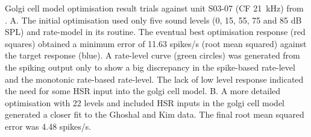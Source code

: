 Golgi cell model optimisation result trials against unit S03-07 (CF 21~kHz) from
\citep{GhoshalKim:1996}. A. The initial optimisation used only five sound levels
(0, 15, 55, 75 and 85 dB SPL) and rate-model in its routine. The eventual best
optimisation response (red squares) obtained a minimum error of 11.63 spikes/s
(root mean squared) against the target response (blue). A rate-level curve
(green circles) was generated from the spiking output only to show a big
discrepancy in the spike-based rate-level and the monotonic rate-based
rate-level. The lack of low level response indicated the need for some HSR input
into the golgi cell model. B. A more detailed optimisation with 22 levels and
included HSR inputs in the golgi cell model generated a closer fit to the
Ghoshal and Kim data.  The final root mean squared error was 4.48 spikes/s.














